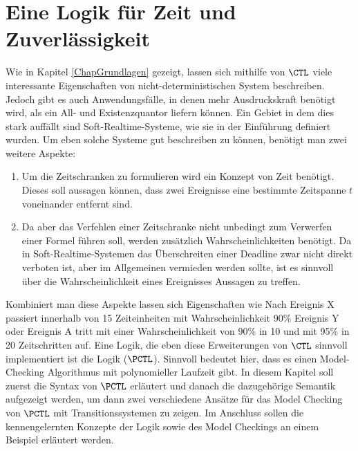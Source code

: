 \section{Eine Logik für Zeit und Zuverlässigkeit}
\label{ChapSyntaxSemantik}


Wie in Kapitel \ref{ChapGrundlagen} gezeigt, lassen sich mithilfe von $\CTL$ viele interessante Eigenschaften von nicht-deterministischen System beschreiben. 
Jedoch gibt es auch Anwendungsfälle, in denen mehr Ausdruckskraft benötigt wird, als ein All- und Existenzquantor liefern können.
Ein Gebiet in dem dies stark auffällt sind Soft-Realtime-Systeme, wie sie in der Einführung definiert wurden. 
Um eben solche Systeme gut beschreiben zu können, benötigt man zwei weitere Aspekte:
\begin{enumerate}
	\item Um die Zeitschranken zu formulieren wird ein Konzept von Zeit benötigt. Dieses soll aussagen können, dass zwei Ereignisse eine bestimmte Zeitspanne $t$ voneinander entfernt sind.
	\item Da aber das Verfehlen einer Zeitschranke nicht unbedingt zum Verwerfen einer Formel führen soll, werden zusätzlich Wahrscheinlichkeiten benötigt. 
	Da in Soft-Realtime-Systemen das Überschreiten einer Deadline zwar nicht direkt verboten ist, aber im Allgemeinen vermieden werden sollte, ist es sinnvoll über die Wahrscheinlichkeit eines Ereignisses Aussagen zu treffen.
\end{enumerate}
Kombiniert man diese Aspekte lassen sich Eigenschaften wie \glqq Nach Ereignis X passiert innerhalb von 15 Zeiteinheiten mit Wahrscheinlichkeit 90\% Ereignis Y\grqq{} oder \glqq Ereignis A tritt mit einer Wahrscheinlichkeit von 90\% in 10 und mit 95\% in 20 Zeitschritten auf\grqq. 
Eine Logik, die eben diese Erweiterungen von $\CTL$ sinnvoll implementiert ist die Logik  ($\PCTL$). 
Sinnvoll bedeutet hier, dass es einen Model-Checking Algorithmus mit polynomieller Laufzeit gibt. 
In diesem Kapitel soll zuerst die Syntax von $\PCTL$ erläutert und danach die dazugehörige Semantik aufgezeigt werden, um dann zwei verschiedene Ansätze für das Model Checking von $\PCTL$ mit Transitionssystemen zu zeigen. 
Im Anschluss sollen die kennengelernten Konzepte der Logik sowie des Model Checkings an einem Beispiel erläutert werden.

